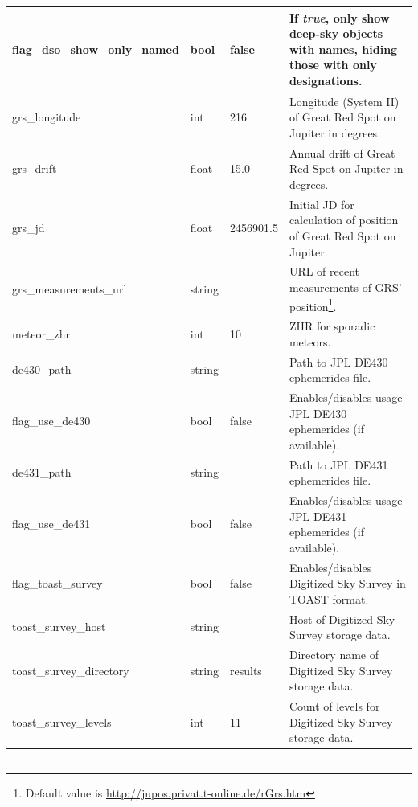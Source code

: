 \begin{longtable}{l|l|l|p{55mm}}
flag\_dso\_show\_only\_named       & bool   & false & If \emph{true}, only show deep-sky objects with names, hiding those with only designations.\\\midrule
%
grs\_longitude                     & int    & 216   & Longitude (System II) of Great Red Spot on Jupiter in degrees.\\%
grs\_drift                         & float  & 15.0  & Annual drift of Great Red Spot on Jupiter in degrees.\\%
grs\_jd                            & float  & 2456901.5 & Initial JD for calculation of position of Great Red Spot on Jupiter.\\%
grs\_measurements\_url             & string &       & URL of recent measurements of GRS' position\footnote{Default value is \url{http://jupos.privat.t-online.de/rGrs.htm}}. \\\midrule
%
meteor\_zhr                        & int    & 10    & ZHR for sporadic meteors.\\\midrule
%
de430\_path                        & string &       & Path to JPL DE430 ephemerides file.\\%
flag\_use\_de430                   & bool   & false & Enables/disables usage JPL DE430 ephemerides (if available).\\%
de431\_path                        & string &       & Path to JPL DE431 ephemerides file.\\%
flag\_use\_de431                   & bool   & false & Enables/disables usage JPL DE431 ephemerides (if available).\\\midrule
%
flag\_toast\_survey                & bool   & false & Enables/disables Digitized Sky Survey in TOAST format.\\%
toast\_survey\_host                & string &       & Host of Digitized Sky Survey storage data.\\%
toast\_survey\_directory           & string & results & Directory name of Digitized Sky Survey storage data.\\%
toast\_survey\_levels              & int    & 11    & Count of levels for Digitized Sky Survey storage data.\\\bottomrule
\end{longtable}

\subsection{}

